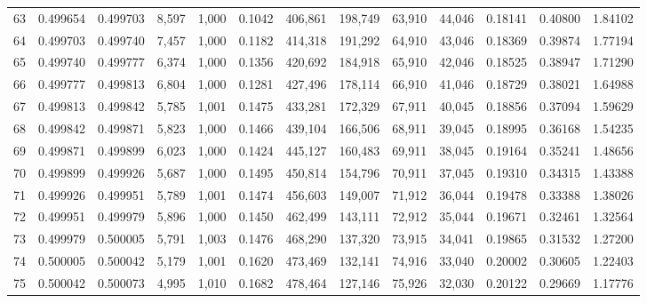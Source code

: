\begin{tabular}{rrrrrrrrrrrrr}
63  &  0.499654 &  0.499703 &  8,597 &  1,000 &                                     0.1042 &  406,861 &  198,749 &   63,910 &   44,046 &  0.18141 &  0.40800 &  1.84102 \\
64  &  0.499703 &  0.499740 &  7,457 &  1,000 &                                     0.1182 &  414,318 &  191,292 &   64,910 &   43,046 &  0.18369 &  0.39874 &  1.77194 \\
65  &  0.499740 &  0.499777 &  6,374 &  1,000 &                                     0.1356 &  420,692 &  184,918 &   65,910 &   42,046 &  0.18525 &  0.38947 &  1.71290 \\
66  &  0.499777 &  0.499813 &  6,804 &  1,000 &                                     0.1281 &  427,496 &  178,114 &   66,910 &   41,046 &  0.18729 &  0.38021 &  1.64988 \\
67  &  0.499813 &  0.499842 &  5,785 &  1,001 &                                     0.1475 &  433,281 &  172,329 &   67,911 &   40,045 &  0.18856 &  0.37094 &  1.59629 \\
68  &  0.499842 &  0.499871 &  5,823 &  1,000 &                                     0.1466 &  439,104 &  166,506 &   68,911 &   39,045 &  0.18995 &  0.36168 &  1.54235 \\
69  &  0.499871 &  0.499899 &  6,023 &  1,000 &                                     0.1424 &  445,127 &  160,483 &   69,911 &   38,045 &  0.19164 &  0.35241 &  1.48656 \\
70  &  0.499899 &  0.499926 &  5,687 &  1,000 &                                     0.1495 &  450,814 &  154,796 &   70,911 &   37,045 &  0.19310 &  0.34315 &  1.43388 \\
71  &  0.499926 &  0.499951 &  5,789 &  1,001 &                                     0.1474 &  456,603 &  149,007 &   71,912 &   36,044 &  0.19478 &  0.33388 &  1.38026 \\
72  &  0.499951 &  0.499979 &  5,896 &  1,000 &                                     0.1450 &  462,499 &  143,111 &   72,912 &   35,044 &  0.19671 &  0.32461 &  1.32564 \\
73  &  0.499979 &  0.500005 &  5,791 &  1,003 &                                     0.1476 &  468,290 &  137,320 &   73,915 &   34,041 &  0.19865 &  0.31532 &  1.27200 \\
74  &  0.500005 &  0.500042 &  5,179 &  1,001 &                                     0.1620 &  473,469 &  132,141 &   74,916 &   33,040 &  0.20002 &  0.30605 &  1.22403 \\
75  &  0.500042 &  0.500073 &  4,995 &  1,010 &                                     0.1682 &  478,464 &  127,146 &   75,926 &   32,030 &  0.20122 &  0.29669 &  1.17776 \\

\end{tabular}
